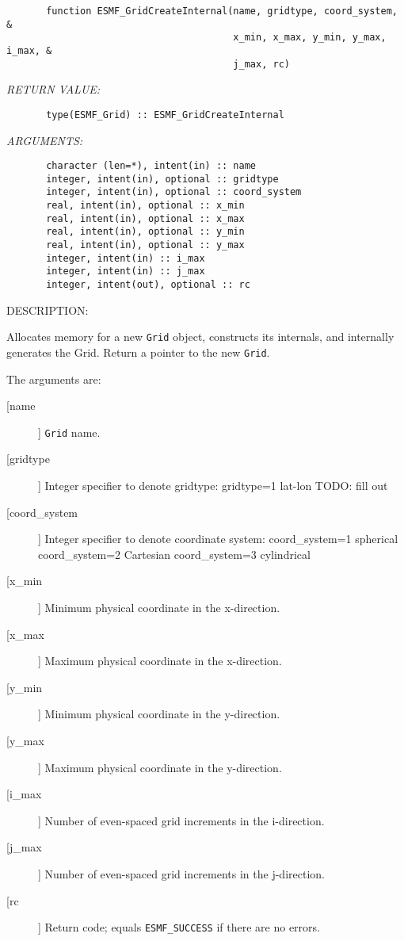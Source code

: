 {
\begin{verbatim}       function ESMF_GridCreateInternal(name, gridtype, coord_system, &
                                        x_min, x_max, y_min, y_max, i_max, &
                                        j_max, rc)\end{verbatim}{\em RETURN VALUE:}
\begin{verbatim}       type(ESMF_Grid) :: ESMF_GridCreateInternal\end{verbatim}{\em ARGUMENTS:}
\begin{verbatim}       character (len=*), intent(in) :: name
       integer, intent(in), optional :: gridtype
       integer, intent(in), optional :: coord_system
       real, intent(in), optional :: x_min
       real, intent(in), optional :: x_max
       real, intent(in), optional :: y_min
       real, intent(in), optional :: y_max
       integer, intent(in) :: i_max
       integer, intent(in) :: j_max
       integer, intent(out), optional :: rc\end{verbatim}
{\sf DESCRIPTION:\\ }


       Allocates memory for a new {\tt Grid} object, constructs its
       internals, and internally generates the Grid.  Return a pointer to
       the new {\tt Grid}.
  
       The arguments are:
       \begin{description}
       \item[[name]] 
            {\tt Grid} name.
       \item[[gridtype]] 
            Integer specifier to denote gridtype:
               gridtype=1   lat-lon
               TODO:  fill out
       \item[[coord\_system]]
            Integer specifier to denote coordinate system:
               coord\_system=1   spherical
               coord\_system=2   Cartesian
               coord\_system=3   cylindrical
       \item[[x\_min]]
            Minimum physical coordinate in the x-direction.
       \item[[x\_max]]
            Maximum physical coordinate in the x-direction.
       \item[[y\_min]]
            Minimum physical coordinate in the y-direction.
       \item[[y\_max]]
            Maximum physical coordinate in the y-direction.
       \item[[i\_max]]
            Number of even-spaced grid increments in the i-direction.
       \item[[j\_max]]
            Number of even-spaced grid increments in the j-direction.
       \item[[rc]] 
            Return code; equals {\tt ESMF\_SUCCESS} if there are no errors.
     \end{description}
  
}
